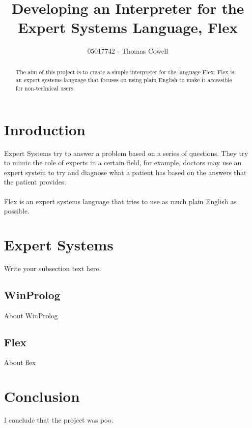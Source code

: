 \documentclass{report}
\begin{document}
\title{Developing an Interpreter for the Expert Systems Language, Flex}
\author{05017742 - Thomas Cowell}

\maketitle

\begin{abstract}
The aim of this project is to create a simple interpreter for the language Flex.  Flex is an expert systems language that focuses on using plain English to make it accessible for
non-technical users.
\end{abstract}

\section{Inroduction}\label{sec:introduction}
Expert Systems try to answer a problem based on a series of questions.  They try to mimic the role of experts in a certain field, for example, doctors may use an expert system to try and diagnose what a patient has based on the answers that the patient provides.\\\\
Flex is an expert systems language that tries to use as much plain English as possible.

\section{Expert Systems}\label{sec:expert_systems}
Write your subsection text here.

\subsection{WinProlog}\label{subsec:winprolog}
About WinProlog

\subsection{Flex}\label{subsec:flex}
About flex


\section{Conclusion}
I conclude that the project was poo.
\end{document}
